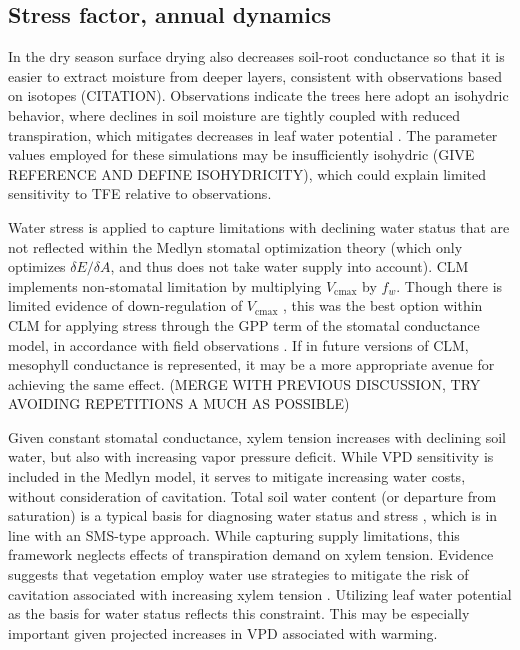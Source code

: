 \documentclass[draft,linenumbers]{agujournal}
\begin{document}
\subsection{Stress factor, annual dynamics}

In the dry season surface drying also decreases soil-root conductance so that it is easier to extract moisture from deeper layers, consistent with observations based on isotopes (CITATION).
Observations indicate the trees here adopt an isohydric behavior, where declines in soil moisture are tightly coupled with reduced transpiration, which mitigates decreases in leaf water potential \citep{fisher2006}. The parameter values employed for these simulations may be insufficiently isohydric (GIVE REFERENCE AND DEFINE ISOHYDRICITY), which could explain limited sensitivity to TFE relative to observations.
    
    Water stress is applied to capture limitations with declining water status that are not reflected within the Medlyn stomatal optimization theory (which only optimizes $\delta E / \delta A$, and thus does not take water supply into account). CLM implements non-stomatal limitation by multiplying $V_{\text{cmax}}$ by $f_w$. Though there is limited evidence of down-regulation of $V_{\text{cmax}}$ \citep{flexas2006}, this was the best option within CLM  for applying stress through the GPP term of the stomatal conductance model, in accordance with field observations \citep{lin2018,zhou2013}.
    If in future versions of CLM, mesophyll conductance is represented, it may be a more appropriate avenue for achieving the same effect. (MERGE WITH PREVIOUS DISCUSSION, TRY AVOIDING REPETITIONS A MUCH AS POSSIBLE)
    
    Given constant stomatal conductance, xylem tension increases with declining soil water, but also with increasing vapor pressure deficit.
    While VPD sensitivity is included in the Medlyn model, it serves to mitigate increasing water costs, without consideration of cavitation.
        Total soil water content (or departure from saturation) is a typical basis for diagnosing water status and stress \citep{drake2017}, which is in line with an SMS-type approach.
    While capturing supply limitations, this framework neglects effects of transpiration demand on xylem tension.
    Evidence suggests that vegetation employ water use strategies to mitigate the risk of cavitation associated with increasing xylem tension \citep{sperry1998,fisher2006,choat2012}.
    Utilizing leaf water potential as the basis for water status reflects this constraint.
    This may be especially important given projected increases in VPD associated with warming.
\end{document}
